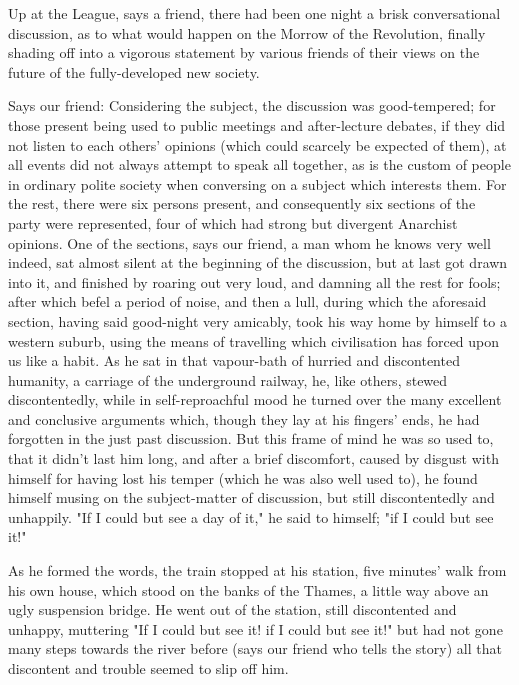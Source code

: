 Up at the League, says a friend, there had been one night a brisk
conversational discussion, as to what would happen on the Morrow of the
Revolution, finally shading off into a vigorous statement by various
friends of their views on the future of the fully-developed new society.

Says our friend: Considering the subject, the discussion was
good-tempered; for those present being used to public meetings and
after-lecture debates, if they did not listen to each others' opinions
(which could scarcely be expected of them), at all events did not always
attempt to speak all together, as is the custom of people in ordinary
polite society when conversing on a subject which interests them. For
the rest, there were six persons present, and consequently six sections
of the party were represented, four of which had strong but divergent
Anarchist opinions. One of the sections, says our friend, a man whom he
knows very well indeed, sat almost silent at the beginning of the
discussion, but at last got drawn into it, and finished by roaring out
very loud, and damning all the rest for fools; after which befel a
period of noise, and then a lull, during which the aforesaid section,
having said good-night very amicably, took his way home by himself to a
western suburb, using the means of travelling which civilisation has
forced upon us like a habit. As he sat in that vapour-bath of hurried
and discontented humanity, a carriage of the underground railway, he,
like others, stewed discontentedly, while in self-reproachful mood he
turned over the many excellent and conclusive arguments which, though
they lay at his fingers' ends, he had forgotten in the just past
discussion. But this frame of mind he was so used to, that it didn't
last him long, and after a brief discomfort, caused by disgust with
himself for having lost his temper (which he was also well used to), he
found himself musing on the subject-matter of discussion, but still
discontentedly and unhappily. "If I could but see a day of it," he said
to himself; "if I could but see it!"

As he formed the words, the train stopped at his station, five minutes'
walk from his own house, which stood on the banks of the Thames, a
little way above an ugly suspension bridge. He went out of the station,
still discontented and unhappy, muttering "If I could but see it! if I
could but see it!" but had not gone many steps towards the river before
(says our friend who tells the story) all that discontent and trouble
seemed to slip off him.

